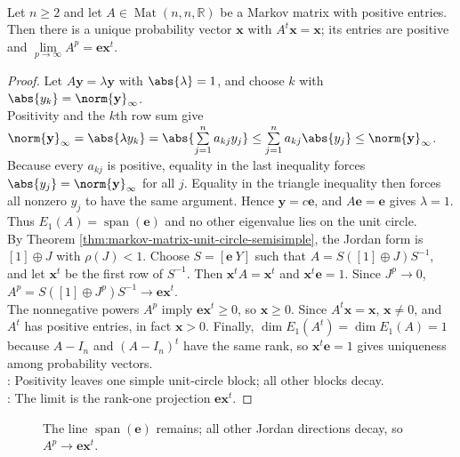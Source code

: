 \begin{theorem} \label{thm:positive-markov-stationary-distribution} \\
Let $n\geq2$ and let $A\in\operatorname{Mat}(n,n,\mathbb{R})$ be a Markov matrix with positive entries. Then there is a unique probability vector $\mathbf{x}$ with $A^t\mathbf{x}=\mathbf{x}$; its entries are positive and $\lim\limits_{p\to\infty}A^p=\mathbf{e}\mathbf{x}^t$.
\begin{proof}
Let $A\mathbf{y}=\lambda\mathbf{y}$ with $\abs{\lambda}=1$, and choose $k$ with $\abs{y_k}=\norm{\mathbf{y}}_{\infty}$.\\
Positivity and the $k$th row sum give $\norm{\mathbf{y}}_{\infty} =\abs{\lambda y_k} =\abs{\sum\limits_{j=1}^{n}a_{kj}y_j} \leq\sum\limits_{j=1}^{n}a_{kj}\abs{y_j} \leq\norm{\mathbf{y}}_{\infty}$.\\
Because every $a_{kj}$ is positive, equality in the last inequality forces $\abs{y_j}=\norm{\mathbf{y}}_{\infty}$ for all $j$. Equality in the triangle inequality then forces all nonzero $y_j$ to have the same argument. Hence $\mathbf{y}=c\mathbf{e}$, and $A\mathbf{e}=\mathbf{e}$ gives $\lambda=1$. Thus $E_1(A)=\operatorname{span}(\mathbf{e})$ and no other eigenvalue lies on the unit circle.\\
By Theorem \ref{thm:markov-matrix-unit-circle-semisimple}, the Jordan form is $[1]\oplus J$ with $\rho(J)<1$. Choose $S=[\mathbf{e}\ Y]$ such that $A=S([1]\oplus J)S^{-1}$, and let $\mathbf{x}^t$ be the first row of $S^{-1}$. Then $\mathbf{x}^tA=\mathbf{x}^t$ and $\mathbf{x}^t\mathbf{e}=1$. Since $J^p\to0$, $A^p=S([1]\oplus J^p)S^{-1}\to \mathbf{e}\mathbf{x}^t$.\\
The nonnegative powers $A^p$ imply $\mathbf{e}\mathbf{x}^t\geq0$, so $\mathbf{x}\geq0$. Since $A^t\mathbf{x}=\mathbf{x}$, $\mathbf{x}\neq0$, and $A^t$ has positive entries, in fact $\mathbf{x}>0$. Finally, $\dim E_1(A^t)=\dim E_1(A)=1$ because $A-I_n$ and $(A-I_n)^t$ have the same rank, so $\mathbf{x}^t\mathbf{e}=1$ gives uniqueness among probability vectors.\\
: Positivity leaves one simple unit-circle block; all other blocks decay.\\
: The limit is the rank-one projection $\mathbf{e}\mathbf{x}^t$.
\end{proof}
\end{theorem}

\begin{figure}[H]
  \centering
  
  \caption{The line $\operatorname{span}(\mathbf{e})$ remains; all other Jordan directions decay, so $A^p\to\mathbf{e}\mathbf{x}^t$.}
  \label{fig:positive-markov-stationary-limit}
\end{figure}
